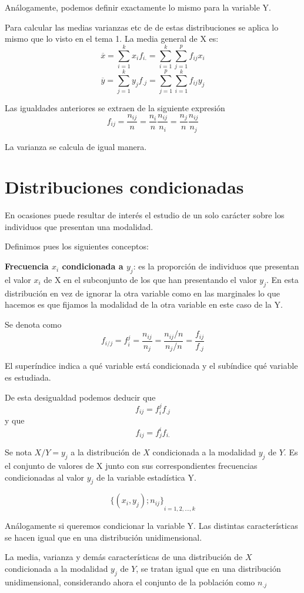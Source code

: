 \documentclass{article}
\theoremstyle{definition}
\begin{document}
Análogamente, podemos definir exactamente lo mismo para la variable Y.

Para calcular las medias varianzas etc de de estas distribuciones se aplica lo
mismo que lo visto en el tema 1. La media general de X es: $$ \overline{x} =
\sum_{i=1}^k x_i f_{i.} =\sum_{i=1}^{k} \sum_{j=1}^{p} f_{ij} x_i$$ $$
\overline{y} = \sum_{j=1}^k y_j f_{.j} =\sum_{j=1}^{p} \sum_{i=1}^{k} f_{ij}
y_j$$

Las igualdades anteriores se extraen de la siguiente expresión $$f_{ij} =
\frac{n_{ij}}{n} = \frac{n_i}{n} \frac{n_{ij}} {n_i} = \frac{n_j}{n}
\frac{n_{ij}}{n_j} $$

La varianza se calcula de igual manera.

\section{Distribuciones condicionadas}

	En ocasiones puede resultar de interés el estudio de un solo carácter sobre
	los individuos que presentan una modalidad.

	Definimos pues los siguientes conceptos:

	\textbf{Frecuencia $x_i$ condicionada a $y_j$}: es la proporción de individuos
	que presentan el valor $x_i$ de X en el subconjunto de los que han presentando
	el valor $y_j$. En esta distribución en vez de ignorar la otra variable como
	en las marginales lo que hacemos es que fijamos la modalidad de la otra
	variable en este caso de la Y.

	Se denota como $$ f_{i/j} = f_i^j = \frac{n_{ij} } {n_j} =
	\frac{n_{ij}/n}{n_j/n} = \frac{f_{ij}}{f_{.j}} $$

	El superíndice indica a qué variable está condicionada y el subíndice qué
	variable es estudiada.

	De esta desigualdad podemos deducir que $$ f_{ij} = f_i^j f_{.j} $$ y que  $$
	f_{ij} = f_j^i f_{i.} $$

	Se nota $X/Y=y_j$ a la distribución de $X$ condicionada a la modalidad $y_j$
	de $Y$. Es el conjunto de valores de X junto con sus correspondientes
	frecuencias condicionadas al valor $y_j$ de la variable estadística Y.

	$$
	{\{(x_i, y_j); n_{ij}\}}_{i=1,2,\dots,k}
	$$

	Análogamente si queremos condicionar la variable Y. Las distintas
	características se hacen igual que en una distribución unidimensional.

	La media, varianza y demás características de una distribución de $X$
	condicionada a la 		modalidad $y_j$ de $Y$, se tratan igual que en una
	distribución unidimensional, considerando ahora el conjunto de la población
	como $n_{.j}$
\end{document}
